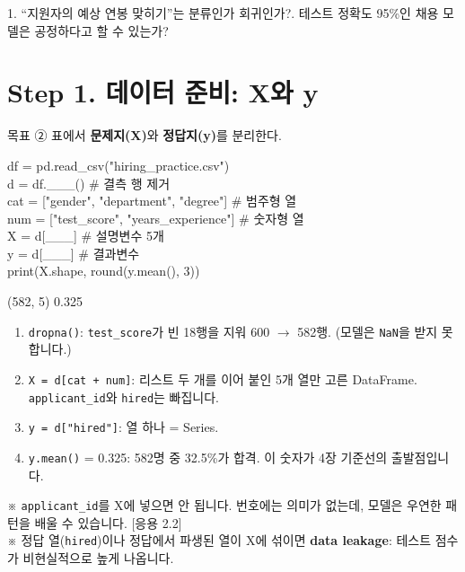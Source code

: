 \documentclass[11pt,a4paper]{article}
\newcommand{\term}[1]{\textbf{#1}}
\newcommand{\code}[1]{\texttt{#1}}
\newcommand{\aside}[1]{{\footnotesize\color{black!65}#1}}
\begin{document}
\begin{qbox}
1. ``지원자의 예상 연봉 맞히기''는 분류인가 회귀인가?. 테스트 정확도 95\%인 채용 모델은 공정하다고 할 수 있는가?
\end{qbox}

\section{Step 1. 데이터 준비: X와 y}
\begin{goalbox}{목표 \quad ②}
표에서 \textbf{문제지(X)}와 \textbf{정답지(y)}를 분리한다.
\end{goalbox}

\begin{codebox}
df = pd.read\_csv("hiring\_practice.csv")\\
d = df.\_\_\_() \hfill \# 결측 행 제거\\
cat = ["gender", "department", "degree"] \hfill \# 범주형 열\\
num = ["test\_score", "years\_experience"] \hfill \# 숫자형 열\\
X = d[\_\_\_] \hfill \# 설명변수 5개\\
y = d[\_\_\_] \hfill \# 결과변수\\
print(X.shape, round(y.mean(), 3))
\end{codebox}
\begin{outbox}
(582, 5) 0.325
\end{outbox}

\begin{howbox}
\begin{enumerate}
\item \code{dropna()}: \code{test\_score}가 빈 18행을 지워 600 $\to$ 582행. (모델은 \code{NaN}을 받지 못합니다.)
\item \code{X = d[cat + num]}: 리스트 두 개를 이어 붙인 5개 열만 고른 DataFrame. \code{applicant\_id}와 \code{hired}는 빠집니다.
\item \code{y = d["hired"]}: 열 하나 = Series.
\item \code{y.mean()} = 0.325: 582명 중 32.5\%가 합격. 이 숫자가 4장 기준선의 출발점입니다.
\end{enumerate}
\end{howbox}
\aside{※ \code{applicant\_id}를 X에 넣으면 안 됩니다. 번호에는 의미가 없는데, 모델은 우연한 패턴을 배울 수 있습니다. [응용 2.2]}\\
\aside{※ 정답 열(\code{hired})이나 정답에서 파생된 열이 X에 섞이면 \term{data leakage}: 테스트 점수가 비현실적으로 높게 나옵니다.}
\end{document}
